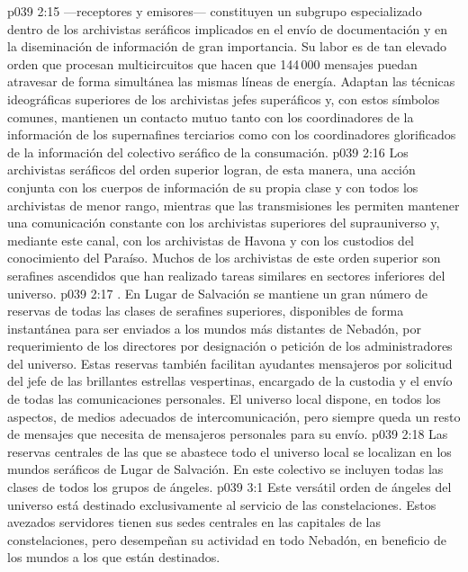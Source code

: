 \vs p039 2:15 \pc {} ---receptores y emisores--- constituyen un subgrupo especializado dentro de los archivistas seráficos implicados en el envío de documentación y en la diseminación de información de gran importancia. Su labor es de tan elevado orden que procesan multicircuitos que hacen que 144\,000 mensajes puedan atravesar de forma simultánea las mismas líneas de energía. Adaptan las técnicas ideográficas superiores de los archivistas jefes superáficos y, con estos símbolos comunes, mantienen un contacto mutuo tanto con los coordinadores de la información de los supernafines terciarios como con los coordinadores glorificados de la información del colectivo seráfico de la consumación.
\vs p039 2:16 Los archivistas seráficos del orden superior logran, de esta manera, una acción conjunta con los cuerpos de información de su propia clase y con todos los archivistas de menor rango, mientras que las transmisiones les permiten mantener una comunicación constante con los archivistas superiores del suprauniverso y, mediante este canal, con los archivistas de Havona y con los custodios del conocimiento del Paraíso. Muchos de los archivistas de este orden superior son serafines ascendidos que han realizado tareas similares en sectores inferiores del universo.
\vs p039 2:17 . En Lugar de Salvación se mantiene un gran número de reservas de todas las clases de serafines superiores, disponibles de forma instantánea para ser enviados a los mundos más distantes de Nebadón, por requerimiento de los directores por designación o petición de los administradores del universo. Estas reservas también facilitan ayudantes mensajeros por solicitud del jefe de las brillantes estrellas vespertinas, encargado de la custodia y el envío de todas las comunicaciones personales. El universo local dispone, en todos los aspectos, de medios adecuados de intercomunicación, pero siempre queda un resto de mensajes que necesita de mensajeros personales para su envío.
\vs p039 2:18 \pc Las reservas centrales de las que se abastece todo el universo local se localizan en los mundos seráficos de Lugar de Salvación. En este colectivo se incluyen todas las clases de todos los grupos de ángeles.
\vs p039 3:1 Este versátil orden de ángeles del universo está destinado exclusivamente al servicio de las constelaciones. Estos avezados servidores tienen sus sedes centrales en las capitales de las constelaciones, pero desempeñan su actividad en todo Nebadón, en beneficio de los mundos a los que están destinados.
